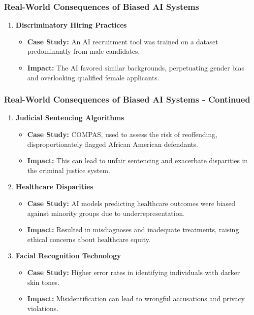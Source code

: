 \documentclass{beamer}
\begin{document}
\begin{frame}[fragile]
    \frametitle{Real-World Consequences of Biased AI Systems}
    \begin{enumerate}
        \item \textbf{Discriminatory Hiring Practices}
        \begin{itemize}
            \item \textbf{Case Study:} An AI recruitment tool was trained on a dataset predominantly from male candidates.
            \item \textbf{Impact:} The AI favored similar backgrounds, perpetuating gender bias and overlooking qualified female applicants.
        \end{itemize}
    \end{enumerate}
\end{frame}

\begin{frame}[fragile]
    \frametitle{Real-World Consequences of Biased AI Systems - Continued}
    \begin{enumerate}[resume]
        \item \textbf{Judicial Sentencing Algorithms}
        \begin{itemize}
            \item \textbf{Case Study:} COMPAS, used to assess the risk of reoffending, disproportionately flagged African American defendants.
            \item \textbf{Impact:} This can lead to unfair sentencing and exacerbate disparities in the criminal justice system.
        \end{itemize}
        
        \item \textbf{Healthcare Disparities}
        \begin{itemize}
            \item \textbf{Case Study:} AI models predicting healthcare outcomes were biased against minority groups due to underrepresentation.
            \item \textbf{Impact:} Resulted in misdiagnoses and inadequate treatments, raising ethical concerns about healthcare equity.
        \end{itemize}
        
        \item \textbf{Facial Recognition Technology}
        \begin{itemize}
            \item \textbf{Case Study:} Higher error rates in identifying individuals with darker skin tones.
            \item \textbf{Impact:} Misidentification can lead to wrongful accusations and privacy violations.
        \end{itemize}
    \end{enumerate}
\end{frame}
\end{document}
